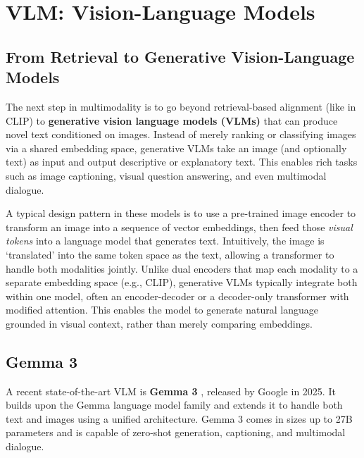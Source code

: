 \section{VLM: Vision-Language Models}

\subsection{From Retrieval to Generative Vision-Language Models}
The next step in multimodality is to go beyond retrieval-based alignment (like in CLIP) to \textbf{generative vision language models (VLMs)} that can produce novel text conditioned on images. 
Instead of merely ranking or classifying images via a shared embedding space, generative VLMs take an image (and optionally text) as input and output descriptive or explanatory text. 
This enables rich tasks such as image captioning, visual question answering, and even multimodal dialogue.


A typical design pattern in these models is to use a pre-trained image encoder to transform an image into a sequence of vector embeddings, then feed those \textit{visual tokens} into a language model that generates text. 
Intuitively, the image is `translated' into the same token space as the text, allowing a transformer to handle both modalities jointly. 
Unlike dual encoders that map each modality to a separate embedding space (e.g., CLIP), generative VLMs typically integrate both within one model, often an encoder-decoder or a decoder-only transformer with modified attention. 
This enables the model to generate natural language grounded in visual context, rather than merely comparing embeddings.

\subsection{Gemma 3}
A recent state-of-the-art VLM is \textbf{Gemma 3} \citep{gemma3}, released by Google in 2025. It builds upon the Gemma language model family and extends it to handle both text and images using a unified architecture. Gemma 3 comes in sizes up to 27B parameters and is capable of zero-shot generation, captioning, and multimodal dialogue.

